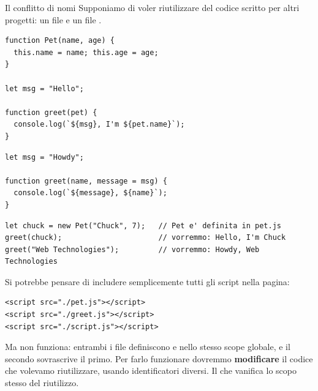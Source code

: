 \begin{esempio}{Il conflitto di nomi}
Supponiamo di voler riutilizzare del codice scritto per altri progetti: un file
 e un file .

\begin{affianco}[0.52]
\begin{lstlisting}[style=js, name=pet.js]
function Pet(name, age) {
  this.name = name; this.age = age;
}

let msg = "Hello";

function greet(pet) {
  console.log(`${msg}, I'm ${pet.name}`);
}
\end{lstlisting}
\risultato
\begin{lstlisting}[style=js, name=greet.js]
let msg = "Howdy";

function greet(name, message = msg) {
  console.log(`${message}, ${name}`);
}
\end{lstlisting}
\end{affianco}

\begin{lstlisting}[style=js, name=script.js]
let chuck = new Pet("Chuck", 7);   // Pet e' definita in pet.js
greet(chuck);                      // vorremmo: Hello, I'm Chuck
greet("Web Technologies");         // vorremmo: Howdy, Web Technologies
\end{lstlisting}

Si potrebbe pensare di includere semplicemente tutti gli script nella pagina:

\begin{affianco}[0.45][c]
\begin{lstlisting}[style=html]
<script src="./pet.js"></script>
<script src="./greet.js"></script>
<script src="./script.js"></script>
\end{lstlisting}
\risultato
\begin{immagine}
\end{immagine}
\end{affianco}

Ma non funziona: entrambi i file definiscono  e  nello
stesso scope globale, e il secondo sovrascrive il primo. Per farlo funzionare
dovremmo \textbf{modificare} il codice che volevamo riutilizzare, usando
identificatori diversi. Il che vanifica lo scopo stesso del riutilizzo.
\end{esempio}

